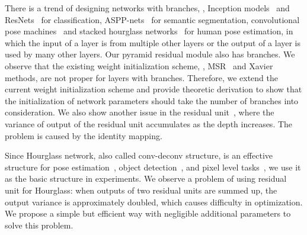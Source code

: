 \documentclass[10pt,twocolumn,letterpaper]{article}
\begin{document}
There is a trend of designing networks with branches, \eg, Inception models~\cite{szegedy2015going,ioffe2015batch,szegedy2016rethinking,szegedy2016inception} and ResNets~\cite{he2016deep,he2016identity} for classification, ASPP-nets~\cite{chen2016deeplab} for semantic segmentation, convolutional pose machines~\cite{wei2016convolutional} and stacked hourglass networks~\cite{newell2016stacked} for human pose estimation, in which the input of a layer is from multiple other layers or the output of a layer is used by many other layers. Our pyramid residual module also has branches. We observe that the existing weight initialization scheme, \eg, MSR~\cite{he2015delving} and Xavier~\cite{glorot2010understanding} methods, are not proper for layers with branches. 
Therefore, we extend the current weight initialization scheme and provide theoretic derivation to show that the initialization of network parameters should take the number of branches into consideration.
We also show another issue in the residual unit~\cite{he2016identity}, where the variance of output of the residual unit accumulates as the depth increases. The problem is caused by the identity mapping. 

Since Hourglass network, also called conv-deconv structure, is an effective structure for pose estimation~\cite{newell2016stacked}, object detection~\cite{li2017zoom}, and pixel level tasks~\cite{chen2016single}, we use it as the basic structure in experiments. 
We observe a problem of using residual unit for Hourglass: when outputs of two residual units are summed up, the output variance is approximately doubled, which causes difficulty in optimization. 
We propose a simple but efficient way with negligible additional parameters to solve this problem. 
\end{document}
